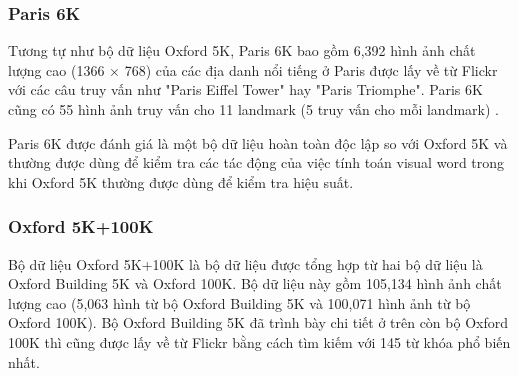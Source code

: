 \subsubsection{Paris 6K}
Tương tự như bộ dữ liệu Oxford 5K, Paris 6K bao gồm 6,392 hình ảnh chất lượng cao (1366 $\times$ 768) của các địa danh nổi tiếng ở Paris được lấy về từ Flickr với các câu truy vấn như "Paris Eiffel Tower" hay "Paris Triomphe". Paris 6K cũng có 55 hình ảnh truy vấn cho 11 landmark (5 truy vấn cho mỗi landmark) \cite{philbin2008lost}.

Paris 6K được đánh giá là một bộ dữ liệu hoàn toàn độc lập so với Oxford 5K và thường được dùng để kiểm tra các tác động của việc tính toán visual word trong khi Oxford 5K thường được dùng để kiểm tra hiệu suất.

\subsubsection{Oxford 5K+100K}
%
%

Bộ dữ liệu Oxford 5K+100K là bộ dữ liệu được tổng hợp từ hai bộ dữ liệu là Oxford Building 5K và Oxford 100K. Bộ dữ liệu này gồm 105,134 hình ảnh chất lượng cao (5,063 hình từ bộ Oxford Building 5K và 100,071 hình ảnh từ bộ Oxford 100K). Bộ Oxford Building 5K đã trình bày chi tiết ở trên còn bộ Oxford 100K thì cũng được lấy về từ Flickr bằng cách tìm kiếm với 145 từ khóa phổ biến nhất.

